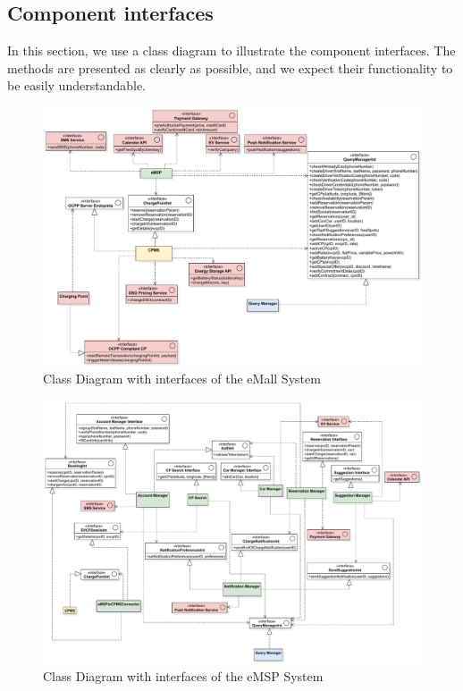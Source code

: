 \subsection{Component interfaces}
In this section, we use a class diagram to illustrate the component interfaces. The methods are presented as clearly as possible, and we expect their functionality to be easily understandable.
\begin{figure}[H]
    \centering
    \hspace*{-2.5cm}
    \includegraphics[scale=0.6]{src/componentInterfaces/overview_interface.pdf}
    \caption{Class Diagram with interfaces of the eMall System}
\end{figure}
\begin{figure}[hp]
    \centering
    \hspace*{-2.5cm}
    \includegraphics[scale=0.55]{src/componentInterfaces/emsp_interface.pdf}
    \caption{Class Diagram with interfaces of the eMSP System}
\end{figure}
